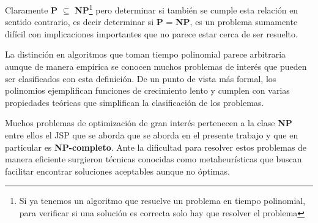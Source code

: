 Claramente \textbf{P} $\subseteq$ \textbf{NP}\footnote{Si ya tenemos un algoritmo que resuelve un problema en tiempo polinomial, para verificar si una solución es correcta solo hay que resolver el problema} pero determinar si también se cumple esta relación en sentido contrario, es decir determinar si \textbf{P} = \textbf{NP}, es un problema sumamente difícil con implicaciones importantes que no parece estar cerca de ser resuelto.

La distinción en algoritmos que toman tiempo polinomial parece arbitraria aunque de manera empírica se conocen muchos problemas de interés que pueden ser clasificados con esta definición. De un punto de vista más formal, los polinomios ejemplifican funciones de crecimiento lento y cumplen con varias propiedades teóricas que simplifican la clasificación de los problemas\cite{wigderson2006p}.


Muchos problemas de optimización de gran interés pertenecen a la clase \textbf{NP} entre ellos el JSP que se aborda que se aborda en el presente trabajo y que en particular es \textbf{NP-completo}. Ante la dificultad para resolver estos problemas de manera eficiente surgieron técnicas conocidas como metaheurísticas que buscan facilitar encontrar soluciones aceptables aunque no óptimas.


